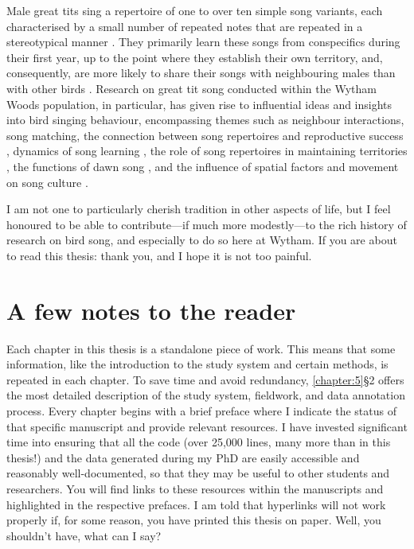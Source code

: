 Male great tits sing a repertoire of one to over ten simple song variants, each characterised by a small number of repeated notes that are repeated in a stereotypical manner \autocite{krebs1978,rivera-gutierrez2010a}. They primarily learn these songs from conspecifics during their first year, up to the point where they establish their own territory, and, consequently, are more likely to share their songs with neighbouring males than with other birds \autocite{mcgregor1982,mcgregor1989}. Research on great tit song conducted within the Wytham Woods population, in particular, has given rise to influential ideas and insights into bird singing behaviour, encompassing themes such as neighbour interactions, song matching, the connection between song repertoires and reproductive success \parencite{mcgregor1981, mcgregor1983, mcgregor1989}, dynamics of song learning \parencite{mcgregor1989, mcgregor1982b}, the role of song repertoires in maintaining territories \parencite{krebs1976, krebs1978}, the functions of dawn song \parencite{kacelnik1983, mace1987}, and the influence of spatial factors and movement on song culture \parencite{fayet2014}. 

I am not one to particularly cherish tradition in other aspects of life, but I feel honoured to be able to contribute---if much more modestly---to the rich history of research on bird song, and especially to do so here at Wytham. If you are about to read this thesis: thank you, and I hope it is not too painful.

\section{A few notes to the reader}
Each chapter in this thesis is a standalone piece of work. This means that some information, like the introduction to the study system and certain methods, is repeated in each chapter. To save time and avoid redundancy, \autoref{chapter:5}§2 offers the most detailed description of the study system, fieldwork, and data annotation process.
Every chapter begins with a brief preface where I indicate the status of that specific manuscript and provide relevant resources. I have invested significant time into ensuring that all the code (over 25,000 lines, many more than in this thesis!) and the data generated during my PhD are easily accessible and reasonably well-documented, so that they may be useful to other students and researchers. You will find links to these resources within the manuscripts and highlighted in the respective prefaces.
I am told that hyperlinks will not work properly if, for some reason, you have printed this thesis on paper. Well, you shouldn’t have, what can I say?

\renewcommand{\cleardoublepage}{}
\renewcommand{\clearpage}{}
\printbibliography

